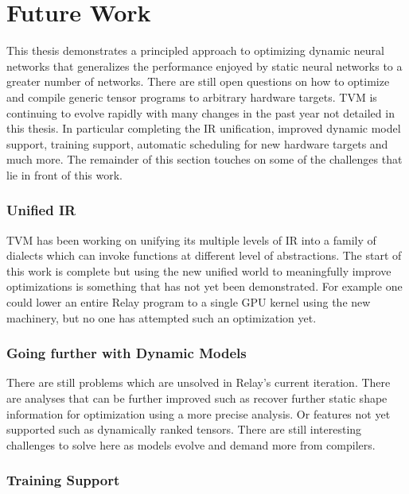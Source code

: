 \chapter{Future Work}
\label{ch:future}

This thesis demonstrates a principled approach to optimizing dynamic neural networks
    that generalizes the performance enjoyed by static neural networks to a greater
    number of networks.
There are still open questions on how to optimize and compile
    generic tensor programs to arbitrary hardware targets.
TVM is continuing to evolve rapidly
    with many changes in the past year not detailed
    in this thesis.
In particular completing the IR unification, improved
    dynamic model support, training support, automatic
    scheduling for new hardware targets and much more.
The remainder of this section touches on some of the
    challenges that lie in front of this work.

\subsection{Unified IR}

TVM has been working on unifying its multiple levels of
    IR into a family of dialects which can invoke functions
    at different level of abstractions.
The start of this work is complete but using the
    new unified world to meaningfully improve optimizations
    is something that has not yet been demonstrated.
For example one could lower an entire Relay program
    to a single GPU kernel using the new machinery,
    but no one has attempted such an optimization yet.

\subsection{Going further with Dynamic Models}

There are still problems which are unsolved in Relay's
    current iteration.
There are analyses that can be further improved such as
    recover further static shape information for optimization
    using a more precise analysis.
Or features not yet supported such as dynamically ranked tensors.
There are still interesting challenges to solve here as
    models evolve and demand more from compilers.

\subsection{Training Support}

